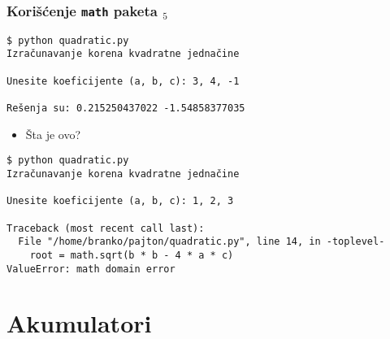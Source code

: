 \documentclass[utf8,compress,aspectratio=169]{beamer}
\begin{document}
\begin{frame}[fragile,shrink=5]
  \frametitle{Korišćenje \texttt{math} paketa $_5$}
\begin{verbatim}
$ python quadratic.py
Izračunavanje korena kvadratne jednačine

Unesite koeficijente (a, b, c): 3, 4, -1

Rešenja su: 0.215250437022 -1.54858377035
\end{verbatim}
  \begin{itemize}
    \item Šta je ovo?
  \end{itemize}
\begin{verbatim}
$ python quadratic.py
Izračunavanje korena kvadratne jednačine

Unesite koeficijente (a, b, c): 1, 2, 3

Traceback (most recent call last):
  File "/home/branko/pajton/quadratic.py", line 14, in -toplevel-
    root = math.sqrt(b * b - 4 * a * c)
ValueError: math domain error
\end{verbatim}

\end{frame}


\section{Akumulatori}

\end{document}
